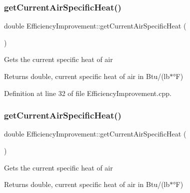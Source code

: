 \subsubsection{\texorpdfstring{get\+Current\+Air\+Specific\+Heat()}{getCurrentAirSpecificHeat()}\hspace{0.1cm}{\footnotesize\ttfamily [1/3]}}
{\footnotesize\ttfamily double Efficiency\+Improvement\+::get\+Current\+Air\+Specific\+Heat (\begin{DoxyParamCaption}{ }\end{DoxyParamCaption})}

Gets the current specific heat of air

\begin{DoxyReturn}{Returns}
double, current specific heat of air in Btu/(lb$\ast$°F) 
\end{DoxyReturn}


Definition at line 32 of file Efficiency\+Improvement.\+cpp.

\mbox{\label{class_efficiency_improvement_a0d8b0d8968802a7994784380be376dfb}} 
\subsubsection{\texorpdfstring{get\+Current\+Air\+Specific\+Heat()}{getCurrentAirSpecificHeat()}\hspace{0.1cm}{\footnotesize\ttfamily [2/3]}}
{\footnotesize\ttfamily double Efficiency\+Improvement\+::get\+Current\+Air\+Specific\+Heat (\begin{DoxyParamCaption}{ }\end{DoxyParamCaption})}

Gets the current specific heat of air

\begin{DoxyReturn}{Returns}
double, current specific heat of air in Btu/(lb$\ast$°F) 
\end{DoxyReturn}
\mbox{\label{class_efficiency_improvement_a0d8b0d8968802a7994784380be376dfb}} 
